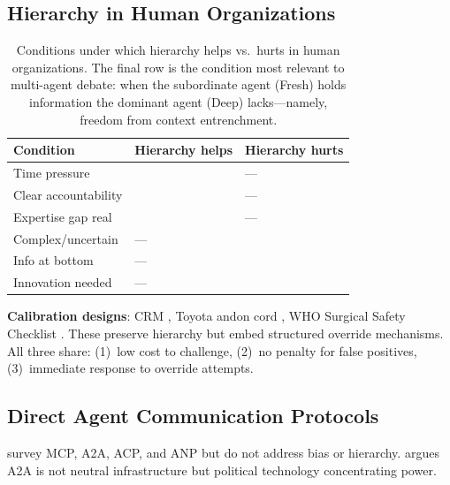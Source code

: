 \documentclass[11pt]{article}
\theoremstyle{definition}
\begin{document}
\subsection{Hierarchy in Human Organizations}
\label{sec:human_hierarchy}

\begin{table}[h]
\centering
\small
\begin{tabular}{@{}lll@{}}
\toprule
\textbf{Condition} & \textbf{Hierarchy helps} & \textbf{Hierarchy hurts} \\
\midrule
Time pressure        & \citet{klein1999sources}      & --- \\
Clear accountability & \citet{weber1922economy}      & --- \\
Expertise gap real   & \citet{eisenhardt1988politics} & --- \\
Complex/uncertain    & ---                            & \citet{edmondson1999psychological} \\
Info at bottom       & ---                            & \citet{sexton2000error} \\
Innovation needed    & ---                            & \citet{christensen1997innovator} \\
\bottomrule
\end{tabular}
\caption{Conditions under which hierarchy helps vs.\ hurts in human organizations. The final row is the condition most relevant to multi-agent debate: when the subordinate agent (Fresh) holds information the dominant agent (Deep) lacks---namely, freedom from context entrenchment.}
\label{tab:hierarchy_conditions}
\end{table}

\textbf{Calibration designs}: CRM \citep{helmreich1999crm}, Toyota andon cord \citep{liker2004toyota}, WHO Surgical Safety Checklist \citep{haynes2009surgical}. These preserve hierarchy but embed structured override mechanisms. All three share: (1)~low cost to challenge, (2)~no penalty for false positives, (3)~immediate response to override attempts.

\subsection{Direct Agent Communication Protocols}

\citet{hua2025survey} survey MCP, A2A, ACP, and ANP but do not address bias or hierarchy. \citet{foster2025protocols} argues A2A is not neutral infrastructure but political technology concentrating power.
\end{document}
